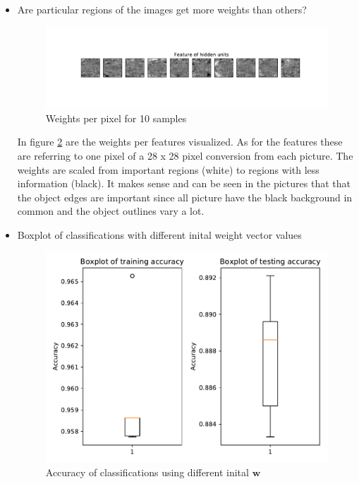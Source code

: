 \documentclass{article}
\begin{document}
\begin{itemize}
    \item Are particular regions of the images get more weights than others?
      
        \begin{figure}[!ht]
		\centering
		\includegraphics[width=1.2 \textwidth]{./Figures/2_weights.pdf}
		\caption{Weights per pixel for 10 samples}
		\label{weights}
		\end{figure}
	
	    In figure \ref{weights} are the weights per features visualized. As for the features these are referring to one pixel of a 28 x 28 pixel conversion from each picture. The weights are scaled from important regions (white) to regions with less information (black). It makes sense and can be seen in the pictures that that the object edges are important since all picture have the black background in common and the object outlines vary a lot.
	  
	\newpage    
    \item Boxplot of classifications with different inital weight vector values
    
        \begin{figure}[!ht]
		\centering
		\includegraphics[width=1 \textwidth]{./Figures/2_1_boxplot.pdf}
		\caption{Accuracy of classifications using different inital $\mathbf{w}$}
		\label{weights}
		\end{figure}
		

\end{itemize}
\end{document}
